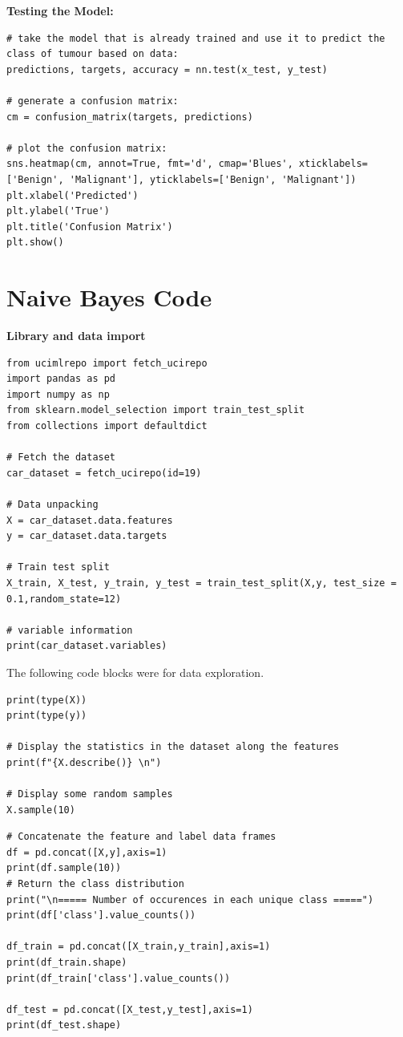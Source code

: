 \documentclass[a4paper]{article}
\begin{document}
\newpage
\textbf{Testing the Model:}
\begin{lstlisting}[basicstyle= \scriptsize]
# take the model that is already trained and use it to predict the class of tumour based on data:
predictions, targets, accuracy = nn.test(x_test, y_test)

# generate a confusion matrix:
cm = confusion_matrix(targets, predictions)

# plot the confusion matrix:
sns.heatmap(cm, annot=True, fmt='d', cmap='Blues', xticklabels=['Benign', 'Malignant'], yticklabels=['Benign', 'Malignant'])
plt.xlabel('Predicted')
plt.ylabel('True')
plt.title('Confusion Matrix')
plt.show()
\end{lstlisting}

\newpage
\section{Naive Bayes Code}
\textbf{Library and data import}
\begin{lstlisting}
from ucimlrepo import fetch_ucirepo
import pandas as pd
import numpy as np
from sklearn.model_selection import train_test_split
from collections import defaultdict

# Fetch the dataset
car_dataset = fetch_ucirepo(id=19)

# Data unpacking
X = car_dataset.data.features
y = car_dataset.data.targets

# Train test split
X_train, X_test, y_train, y_test = train_test_split(X,y, test_size = 0.1,random_state=12)

# variable information 
print(car_dataset.variables)
\end{lstlisting}

The following code blocks were for data exploration.

\begin{lstlisting}
print(type(X))
print(type(y))

# Display the statistics in the dataset along the features
print(f"{X.describe()} \n")

# Display some random samples
X.sample(10)
\end{lstlisting}

\begin{lstlisting}
# Concatenate the feature and label data frames
df = pd.concat([X,y],axis=1)
print(df.sample(10))
# Return the class distribution
print("\n===== Number of occurences in each unique class =====")
print(df['class'].value_counts())

df_train = pd.concat([X_train,y_train],axis=1)
print(df_train.shape)
print(df_train['class'].value_counts())

df_test = pd.concat([X_test,y_test],axis=1)
print(df_test.shape)
\end{lstlisting}
\end{document}
